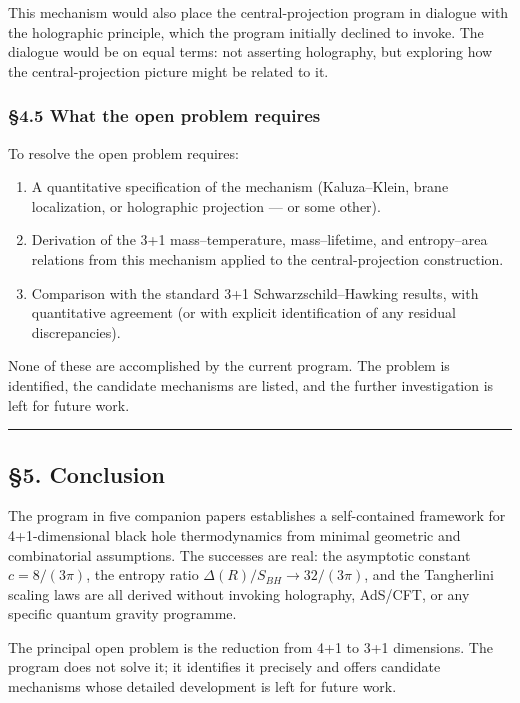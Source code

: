 \documentclass[a4paper,11pt]{article}
\theoremstyle{definition}
\providecommand{\tightlist}{\setlength{\itemsep}{0pt}\setlength{\parskip}{0pt}}
\begin{document}
This mechanism would also place the central-projection program in
dialogue with the holographic principle, which the program initially
declined to invoke. The dialogue would be on equal terms: not asserting
holography, but exploring how the central-projection picture might be
related to it.

\subsubsection{§4.5 What the open problem
requires}\label{what-the-open-problem-requires}

To resolve the open problem requires:

\begin{enumerate}
\def\labelenumi{\arabic{enumi}.}
\tightlist
\item
  A quantitative specification of the mechanism (Kaluza--Klein, brane
  localization, or holographic projection --- or some other).
\item
  Derivation of the 3+1 mass--temperature, mass--lifetime, and
  entropy--area relations from this mechanism applied to the
  central-projection construction.
\item
  Comparison with the standard 3+1 Schwarzschild--Hawking results, with
  quantitative agreement (or with explicit identification of any
  residual discrepancies).
\end{enumerate}

None of these are accomplished by the current program. The problem is
identified, the candidate mechanisms are listed, and the further
investigation is left for future work.

\begin{center}\rule{0.5\linewidth}{0.5pt}\end{center}

\subsection{§5. Conclusion}\label{conclusion}

The program in five companion papers establishes a self-contained
framework for 4+1-dimensional black hole thermodynamics from minimal
geometric and combinatorial assumptions. The successes are real: the
asymptotic constant \(c = 8/(3\pi)\), the entropy ratio
\(\Delta(R)/S_{BH} \to 32/(3\pi)\), and the Tangherlini scaling laws are
all derived without invoking holography, AdS/CFT, or any specific
quantum gravity programme.

The principal open problem is the reduction from 4+1 to 3+1 dimensions.
The program does not solve it; it identifies it precisely and offers
candidate mechanisms whose detailed development is left for future work.
\end{document}
